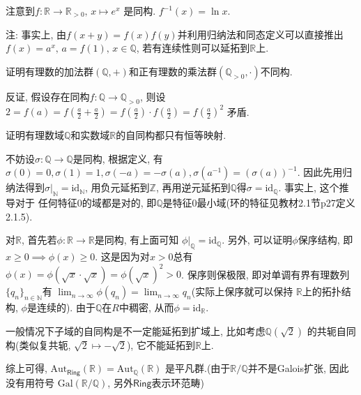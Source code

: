 \begin{solution}
    注意到$f: \mathbb{R} \to \mathbb{R}_{>0},\, x \mapsto e^x$
是同构. $f^{-1}(x) = \ln x$.

注: 事实上, 由$f(x + y) = f(x)f(y)$并利用归纳法和同态定义可以直接推出
$f(x) = a^x,\, a = f(1),\, x \in \mathbb{Q}$, 若有连续性则可以延拓到$\mathbb{R}$上.
\end{solution}

\begin{problem}
    证明有理数的加法群$(\mathbb{Q}, +)$和正有理数的乘法群$(\mathbb{Q}_{>0}, \cdot)$不同构.
\end{problem}

\begin{solution}
    反证, 假设存在同构$f: \mathbb{Q} \to \mathbb{Q}_{>0}$,
则设$2 = f(a) = f(\frac{a}{2} + \frac{a}{2}) = f(\frac{a}{2}) \cdot f(\frac{a}{2}) = f(\frac{a}{2})^2$
矛盾.
\end{solution}

\begin{problem}\label{ex:1.4.7}
    证明有理数域$\mathbb{Q}$和实数域$\mathbb{R}$的自同构都只有恒等映射.
\end{problem}

\begin{solution}
    不妨设$\sigma: \mathbb{Q} \to \mathbb{Q}$是同构, 根据定义,
有$\sigma(0) = 0, \sigma(1) = 1, \sigma(-a) = -\sigma(a), \sigma(a^{-1}) = (\sigma(a))^{-1}$.
因此先用归纳法得到$\sigma|_{\mathbb{N}} = \mathrm{id}_{\mathbb{N}}$, 用负元延拓到$\mathbb{Z}$,
再用逆元延拓到$\mathbb{Q}$得$\sigma = \mathrm{id}_{\mathbb{Q}}$. 事实上, 这个推导对于
任何特征$0$的域都是对的, 即$\mathbb{Q}$是特征$0$最小域(环的特征见教材2.1节p27定义2.1.5).

    对$\mathbb{R}$, 首先若$\phi: \mathbb{R} \to \mathbb{R}$是同构, 有上面可知
$\phi|_{\mathbb{Q}} = \mathrm{id}_{\mathbb{Q}}$. 另外, 可以证明$\phi$保序结构,
即$x \geqslant 0 \implies \phi(x) \geqslant 0$. 这是因为对$x > 0$总有
$\phi(x) = \phi(\sqrt{x} \cdot \sqrt{x}) = \phi(\sqrt{x})^2 > 0$. 保序则保极限,
即对单调有界有理数列$\{q_n\}_{n \in \mathbb{N}}$有
$\lim_{n \to \infty} \phi(q_n) = \lim_{n \to \infty} q_n$(实际上保序就可以保持
$\mathbb{R}$上的拓扑结构, $\phi$是连续的). 由于$\mathbb{Q}$在$R$中稠密,
从而$\phi = \mathrm{id}_{\mathbb{R}}$.

    一般情况下子域的自同构是不一定能延拓到扩域上, 比如考虑$\mathbb{Q}(\sqrt{2})$
的共轭自同构(类似复共轭, $\sqrt{2} \mapsto -\sqrt{2}$), 它不能延拓到$\mathbb{R}$上.

    综上可得,
$\mathrm{Aut}_{\mathsf{Ring}}(\mathbb{R}) = \mathrm{Aut}_{\mathbb{Q}}(\mathbb{R})$
是平凡群.(由于$\mathbb{R}/\mathbb{Q}$并不是Galois扩张, 因此没有用符号
$\mathrm{Gal}(\mathbb{R}/\mathbb{Q})$, 另外$\mathsf{Ring}$表示环范畴)
\end{solution}

